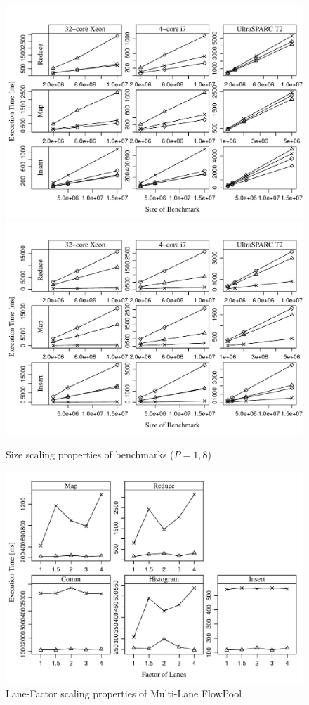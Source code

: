\documentclass[runningheads,a4paper]{llncs}
\begin{document}
\begin{figure}
\includegraphics[width=\textwidth]{../benchmarks/graphs/size-scaling-par1}
\includegraphics[width=\textwidth]{../benchmarks/graphs/size-scaling-par8}
\caption{Size scaling properties of benchmarks ($P = 1, 8$)}
\end{figure}

\begin{figure}
\includegraphics[width=\textwidth]{../benchmarks/graphs/lanef-scaling}
\caption{Lane-Factor scaling properties of Multi-Lane FlowPool}
\end{figure}
\end{document}
